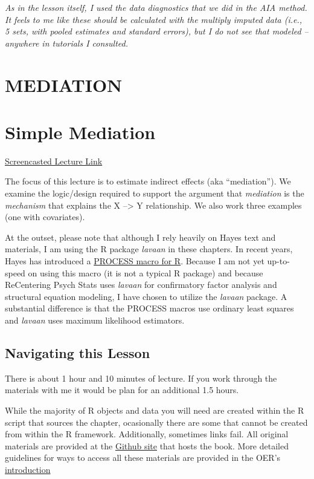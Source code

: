 \documentclass[
  11pt,
]{book}
\begin{document}
\emph{As in the lesson itself, I used the data diagnostics that we did in the AIA method. It feels to me like these should be calculated with the multiply imputed data (i.e., 5 sets, with pooled estimates and standard errors), but I do not see that modeled -- anywhere in tutorials I consulted.}

\hypertarget{MED}{%
\chapter*{MEDIATION}\label{MED}}


\hypertarget{SimpleMed}{%
\chapter{Simple Mediation}\label{SimpleMed}}

\href{https://spu.hosted.panopto.com/Panopto/Pages/Viewer.aspx?pid=7ffb03e6-b34b-4e0b-8f10-ad080180b069}{Screencasted Lecture Link}

The focus of this lecture is to estimate indirect effects (aka ``mediation''). We examine the logic/design required to support the argument that \emph{mediation} is the \emph{mechanism} that explains the X --\textgreater{} Y relationship. We also work three examples (one with covariates).

At the outset, please note that although I rely heavily on Hayes \citeyearpar{hayes_introduction_2018} text and materials, I am using the R package \emph{lavaan} in these chapters. In recent years, Hayes has introduced a \href{https://www.processmacro.org/index.html}{PROCESS macro for R}. Because I am not yet up-to-speed on using this macro (it is not a typical R package) and because ReCentering Psych Stats uses \emph{lavaan} for confirmatory factor analysis and structural equation modeling, I have chosen to utilize the \emph{lavaan} package. A substantial difference is that the PROCESS macros use ordinary least squares and \emph{lavaan} uses maximum likelihood estimators.

\hypertarget{navigating-this-lesson-4}{%
\section{Navigating this Lesson}\label{navigating-this-lesson-4}}

There is about 1 hour and 10 minutes of lecture. If you work through the materials with me it would be plan for an additional 1.5 hours.

While the majority of R objects and data you will need are created within the R script that sources the chapter, ocasionally there are some that cannot be created from within the R framework. Additionally, sometimes links fail. All original materials are provided at the \href{https://github.com/lhbikos/ReC_MultivModel}{Github site} that hosts the book. More detailed guidelines for ways to access all these materials are provided in the OER's \protect\hyperlink{ReCintro}{introduction}
\end{document}
